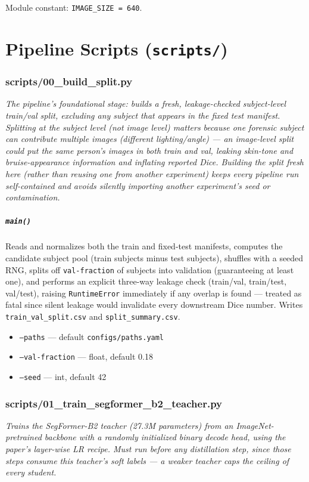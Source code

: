 \documentclass[11pt]{article}
\newcommand{\role}[1]{\par\noindent\textit{#1}\par\vspace{0.5em}}
\newcommand{\func}[1]{\subsubsection*{\texttt{#1}}}
\newcommand{\cliarg}[2]{\item \texttt{#1} --- #2}
\begin{document}
Module constant: \texttt{IMAGE\_SIZE = 640}.

\newpage
\part{Pipeline Scripts (\texttt{scripts/})}

\section{scripts/00\_build\_split.py}
\role{The pipeline's foundational stage: builds a fresh, leakage-checked
subject-level train/val split, excluding any subject that appears in the fixed
test manifest. Splitting at the \emph{subject} level (not image level) matters
because one forensic subject can contribute multiple images (different
lighting/angle) --- an image-level split could put the same person's images in
both train and val, leaking skin-tone and bruise-appearance information and
inflating reported Dice. Building the split fresh here (rather than reusing one
from another experiment) keeps every pipeline run self-contained and avoids
silently importing another experiment's seed or contamination.}

\func{main()}
Reads and normalizes both the train and fixed-test manifests, computes the
candidate subject pool (train subjects minus test subjects), shuffles with a
seeded RNG, splits off \texttt{val-fraction} of subjects into validation
(guaranteeing at least one), and performs an explicit three-way leakage check
(train/val, train/test, val/test), raising \texttt{RuntimeError} immediately if
any overlap is found --- treated as fatal since silent leakage would invalidate
every downstream Dice number. Writes \texttt{train\_val\_split.csv} and
\texttt{split\_summary.csv}.

\begin{itemize}[nosep]
\cliarg{--paths}{default \texttt{configs/paths.yaml}}
\cliarg{--val-fraction}{float, default 0.18}
\cliarg{--seed}{int, default 42}
\end{itemize}

\section{scripts/01\_train\_segformer\_b2\_teacher.py}
\role{Trains the SegFormer-B2 teacher (27.3M parameters) from an
ImageNet-pretrained backbone with a randomly initialized binary decode head,
using the paper's layer-wise LR recipe. Must run before any distillation step,
since those steps consume this teacher's soft labels --- a weaker teacher caps
the ceiling of every student.}
\end{document}
